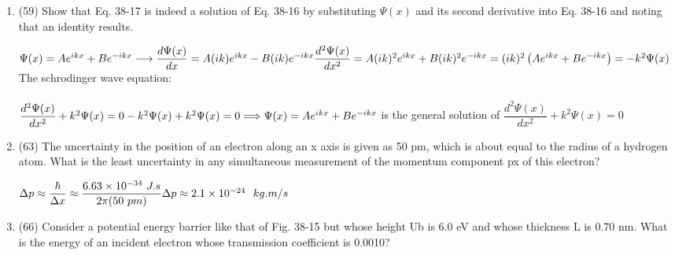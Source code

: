 \documentclass[fleqn]{article}
\begin{document}
\begin{enumerate}
    \item (59) Show that Eq. 38-17 is indeed a solution of Eq. 38-16 by substituting $\Psi(x)$ and its second derivative into Eq. 38-16 and noting
    that an identity results.

      \textcolor{hwColor}{
        $
          \Psi(x)=Ae^{ikx}+Be^{-ikx} \longrightarrow \dfrac{d\Psi(x)}{dx}=A(ik)e^{ikx}-B(ik)e^{-ikx} \\
          \\
          \dfrac{d^2\Psi(x)}{dx^2}=A(ik)^2e^{ikx}+B(ik)^2e^{-ikx}=(ik)^2\left(Ae^{ikx}+Be^{-ikx}\right)=-k^2 \Psi(x) \\
          \\
        $
        The schrodinger wave equation: \\
        \\
        $
          \dfrac{d^2 \Psi(x)}{dx^2}+k^2 \Psi(x)=0 \\
          \\
          -k^2 \Psi(x)+k^2 \Psi(x)=0 \\
          \\
          \Longrightarrow \Psi(x)=Ae^{ikx}+Be^{-ikx}
        $
        is the general solution of $\dfrac{d^2 \Psi(x)}{dx^2}+k^2 \Psi(x)=0$
      }


    \item (63) The uncertainty in the position of an electron along an x axis is given as 50 pm, which is about equal to the radius of a hydrogen atom.
    What is the least uncertainty in any simultaneous measurement of the
    momentum component px of this electron?

      \textcolor{hwColor}{
        $
          \Delta p \approx \dfrac{\hbar}{\Delta x} \approx \dfrac{6.63 \times 10^{-34}~J.s}{2 \pi (50 ~ pm)} \\
          \\
          \Delta p \approx 2.1 \times 10^{-24} ~~ kg.m/s
        $
      }


    \item (66) Consider a potential energy barrier like that of Fig. 38-15 but whose height Ub is 6.0 eV and whose thickness L is 0.70 nm.
    What is the energy of an incident electron whose transmission coefficient is 0.0010?


\end{enumerate}
\end{document}
